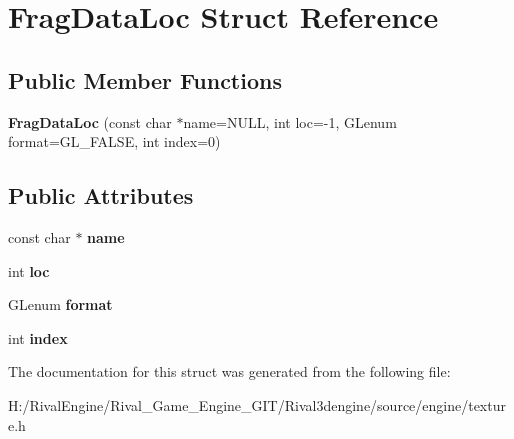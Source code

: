 \hypertarget{struct_frag_data_loc}{}\section{Frag\+Data\+Loc Struct Reference}
\label{struct_frag_data_loc}
\subsection*{Public Member Functions}
\begin{DoxyCompactItemize}
\item 
\mbox{\label{struct_frag_data_loc_a2c5c1b4eb2518ef2cac825f15562d0f3}} 
{\bfseries Frag\+Data\+Loc} (const char $\ast$name=N\+U\+LL, int loc=-\/1, G\+Lenum format=G\+L\+\_\+\+F\+A\+L\+SE, int index=0)
\end{DoxyCompactItemize}
\subsection*{Public Attributes}
\begin{DoxyCompactItemize}
\item 
\mbox{\label{struct_frag_data_loc_a55fa44cb54807d0d85b3833f63bced0a}} 
const char $\ast$ {\bfseries name}
\item 
\mbox{\label{struct_frag_data_loc_a4df9db5ce8f0976850f6937ca06555ca}} 
int {\bfseries loc}
\item 
\mbox{\label{struct_frag_data_loc_afa4ff3fd93ca271c1b2405fad3b54cf6}} 
G\+Lenum {\bfseries format}
\item 
\mbox{\label{struct_frag_data_loc_a0ca3bc3d6df2cb757182040e8dcab5fe}} 
int {\bfseries index}
\end{DoxyCompactItemize}


The documentation for this struct was generated from the following file\+:\begin{DoxyCompactItemize}
\item 
H\+:/\+Rival\+Engine/\+Rival\+\_\+\+Game\+\_\+\+Engine\+\_\+\+G\+I\+T/\+Rival3dengine/source/engine/texture.\+h\end{DoxyCompactItemize}
